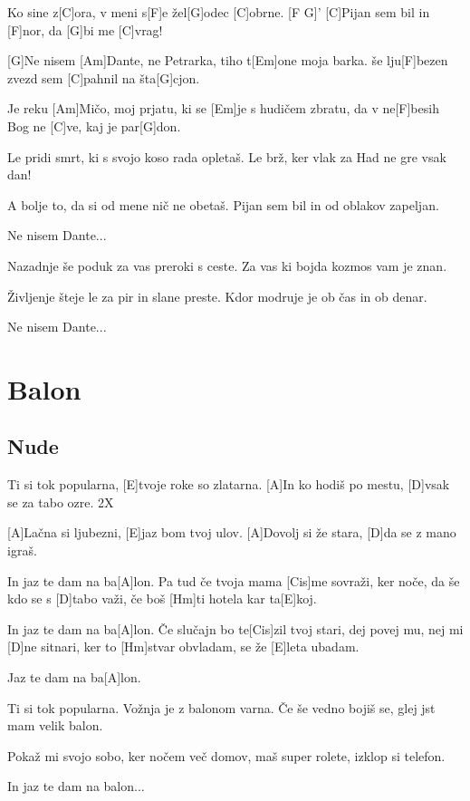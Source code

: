 \documentclass[a4paper,12pt]{article}
\begin{document}
\begin{multicols}{2}
\begin{guitar}
 
Ko sine z[C]ora, 
v meni s[F]e žel[G]odec [C]obrne. [F G]'
[C]Pijan sem bil in [F]nor, da [G]bi me [C]vrag! 


[G]Ne nisem [Am]Dante, ne Petrarka, 
tiho t[Em]one moja barka. 
še lju[F]bezen zvezd sem [C]pahnil na šta[G]cjon. 


Je reku [Am]Mičo, moj prjatu, 
ki se [Em]je s hudičem zbratu, 
da v ne[F]besih Bog ne [C]ve, kaj je par[G]don. 


Le pridi smrt, 
ki s svojo koso rada opletaš. 
Le brž, ker vlak za Had ne gre vsak dan! 


A bolje to, 
da si od mene nič ne obetaš. 
Pijan sem bil in od oblakov zapeljan. 


Ne nisem Dante...


Nazadnje še 
poduk za vas preroki s ceste. 
Za vas ki bojda kozmos vam je znan. 


Življenje šteje 
le za pir in slane preste. 
Kdor modruje je ob čas in ob denar. 

Ne nisem Dante...

\end{guitar}
\section{Balon}
\subsection*{Nude}
\begin{guitar}
[A]Ti si tok popularna,
[E]tvoje roke so zlatarna.
[A]In ko hodiš po mestu,
[D]vsak se za tabo ozre.  2X


[A]Lačna si ljubezni,
[E]jaz bom tvoj ulov.
[A]Dovolj si že stara,
[D]da se z mano igraš.

                   
In jaz te dam na ba[A]lon.
Pa tud če tvoja mama [Cis]me sovraži,
ker noče, da še kdo se s [D]tabo važi,
če boš [Hm]ti hotela kar ta[E]koj.


In jaz te dam na ba[A]lon.
Če slučajn bo te[Cis]zil tvoj stari,
dej povej mu, nej mi [D]ne sitnari,
ker to [Hm]stvar obvladam, se že [E]leta ubadam.


Jaz te dam na ba[A]lon.


Ti si tok popularna.
Vožnja je z balonom varna.
Če še vedno bojiš se,
glej jst mam velik balon.


Pokaž mi svojo sobo,
ker nočem več domov,
maš super rolete,
izklop si telefon.


In jaz te dam na balon...


\end{guitar}
\end{multicols}
\end{document}
